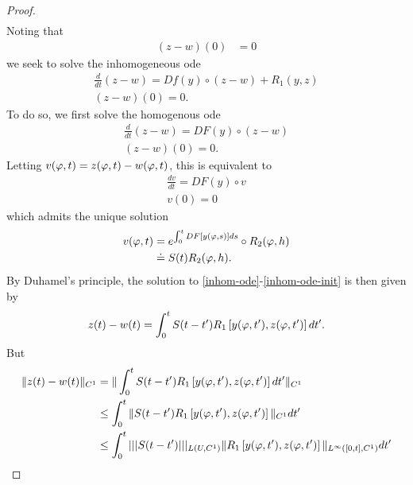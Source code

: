 \begin{proof}
\begin{equation*}
\begin{split}
\end{split}
\end{equation*}
%
%
Noting that %
%
\begin{equation*}
\begin{split}
  (z-w)(0) & = 0
\end{split}
\end{equation*}
%
%
we seek to solve the inhomogeneous ode
%
%
\begin{gather}
  \frac{d}{dt}(z-w)  = Df(y) \circ (z-w) + R_{1}(y,z)
\label{inhom-ode}
  \\
  (z-w)(0) = 0.
  \label{inhom-ode-init}
\end{gather}
%
%
To do so, we first solve the homogenous ode
\begin{gather}
  \frac{d}{dt}(z-w)  = DF(y) \circ (z-w) 
\label{hom-ode}
  \\
  (z-w)(0) = 0.
  \label{hom-ode-init}
\end{gather}
Letting $v(\varphi,t) = z(\varphi,t) - w(\varphi,t)$, this is equivalent to
%
%
%
\begin{gather*}
  \frac{dv}{dt}  = DF(y) \circ v
  \\
  v(0) = 0
\end{gather*}
which admits the unique solution
%
%
\begin{equation*}
\begin{split}
  v(\varphi,t) 
  & = e^{\int_{0}^{t} DF\left[ y(\varphi,s) \right]ds} \circ R_{2}(\varphi,h) 
  \\
  & \doteq S(t)R_{2}(\varphi,h).
\end{split}
\end{equation*}
%
%
By Duhamel's principle, the solution to \eqref{inhom-ode}-\eqref{inhom-ode-init}
is then given by
%
%
\begin{equation*}
\begin{split}
  z(t) - w(t) = \int_{0}^{t} S(t-t') R_{1}\left[ y(\varphi,t'), z(\varphi,t') \right]dt'.
\end{split}
\end{equation*}
%
%
But
%
%
\begin{equation}
  \label{yui}
\begin{split}
  \|z(t) - w(t) \|_{C^{1}}
  & = \| \int_{0}^{t} S(t-t') R_{1}\left[ y(\vp,t'), z(\vp,t')
  \right]dt' \|_{C^{1}}
  \\
  & \le \int_{0}^{t} \| S(t-t') R_{1}\left[ y(\vp,t'), z(\vp,t') \right]
  \|_{C^{1}} dt'
  \\
  & \le \int_{0}^{t}  | | | S(t-t')  | | |_{L(U, C^{1})} \| R_{1}\left[ y(\vp,t'),
  z(\vp,t')
  \right] \|_{L^{\infty}\left( [0,t], C^{1} \right)} dt'

\end{split}
\end{equation}
\end{proof}
